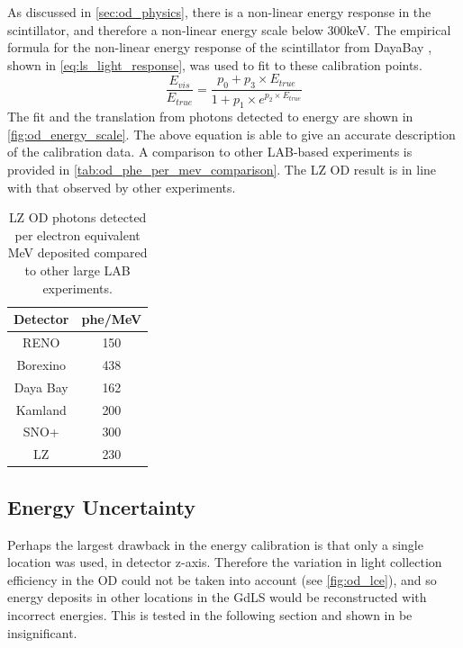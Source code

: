\par
As discussed in \autoref{sec:od_physics}, there is a non-linear energy response in the scintillator, and therefore a non-linear energy scale below 300keV.
The empirical formula for the non-linear energy response of the scintillator from DayaBay \cite{dayabay_antineutrino_oscillation_ref, ls_nonlinear_energy_response_ref}, shown in \autoref{eq:ls_light_response}, was used to fit to these calibration points.
\begin{equation}
    \frac{E_{vis}}{E_{true}} = \frac{p_0  + p_3 \times E_{true}}{1 + p_1 \times e^{p_2 \times E_{true}}}
    \label{eq:ls_light_response}
\end{equation}
The fit and the translation from photons detected to energy are shown in \autoref{fig:od_energy_scale}.
The above equation is able to give an accurate description of the calibration data.
A comparison to other LAB-based experiments is provided in \autoref{tab:od_phe_per_mev_comparison}.
The LZ OD result is in line with that observed by other experiments.



\begin{table}[!htbp]%
    \centering
    \begin{tabular}{c|c}
        Detector & phe/MeV \\ \hline
        RENO     & 150 \cite{reno_phe_per_mev_ref} \\
        Borexino & 438 \cite{pablo_mosteiro_thesis_ref} \\
        Daya Bay & 162 \cite{dayabay_phe_per_mev_ref} \\
        Kamland  & 200 \cite{kamland_phe_per_mev_ref} \\
        SNO+     & 300 \cite{snoplus_phe_per_mev_ref} \\
        LZ       & 230 
    \end{tabular}
    \caption{LZ OD photons detected per electron equivalent MeV deposited compared to other large LAB experiments.}
    \label{tab:od_phe_per_mev_comparison}
\end{table}

\subsection{Energy Uncertainty}
\par
Perhaps the largest drawback in the energy calibration is that only a single location was used, in detector z-axis.
Therefore the variation in light collection efficiency in the OD could not be taken into account (see \autoref{fig:od_lce}), and so energy deposits in other locations in the GdLS would be reconstructed with incorrect energies.
This is tested in the following section and shown in be insignificant.


